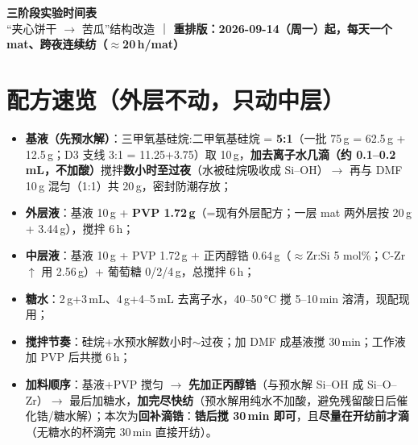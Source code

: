 \documentclass[a4paper, 11pt]{ctexart}
\begin{document}
\begin{center}
{\LARGE\bfseries 三阶段实验时间表}\\[4pt]
{\normalsize ``夹心饼干 $\rightarrow$ 苦瓜''结构改造 ｜ \textbf{重排版：2026-09-14（周一）起，每天一个 mat、跨夜连续纺（$\approx$20\,h/mat）}}
\end{center}

\section*{配方速览（外层不动，只动中层）}
\begin{itemize}[itemsep=1pt, parsep=0pt]
  \item \textbf{基液（先预水解）}：三甲氧基硅烷:二甲氧基硅烷 = \textbf{5:1}（一批 75\,g = 62.5\,g + 12.5\,g；D3 支线 3:1 = 11.25+3.75）取 10\,g，\textbf{加去离子水几滴（约 0.1--0.2\,mL，不加酸）}搅拌\textbf{数小时至过夜}（水被硅烷吸收成 Si--OH）$\rightarrow$ 再与 DMF 10\,g 混匀（1:1）共 20\,g，密封防潮存放；
  \item \textbf{外层液}：基液 10\,g + \textbf{PVP 1.72\,g}（=现有外层配方；一层 mat 两外层按 20\,g + 3.44\,g），搅拌 6\,h；
  \item \textbf{中层液}：基液 10\,g + PVP 1.72\,g + 正丙醇锆 0.64\,g（$\approx$Zr:Si 5 mol\%；C-Zr$\uparrow$ 用 2.56\,g）+ 葡萄糖 0/2/4\,g，总搅拌 6\,h；
  \item \textbf{糖水}：2\,g+3\,mL、4\,g+4--5\,mL 去离子水，40--50\,°C 搅 5--10\,min 溶清，现配现用；
  \item \textbf{搅拌节奏}：硅烷+水预水解数小时$\sim$过夜；加 DMF 成基液搅 30\,min；工作液加 PVP 后共搅 6\,h；
  \item \textbf{加料顺序}：基液+PVP 搅匀 $\rightarrow$ \textbf{先加正丙醇锆}（与预水解 Si--OH 成 Si--O--Zr）$\rightarrow$ 最后加糖水，\textbf{加完尽快纺}（预水解用纯水不加酸，避免残留酸日后催化锆/糖水解）；本次为\textbf{回补滴锆}：\textbf{锆后搅 30\,min 即可}，且\textbf{尽量在开纺前才滴}（无糖水的杯滴完 30\,min 直接开纺）。
\end{itemize}
\end{document}
